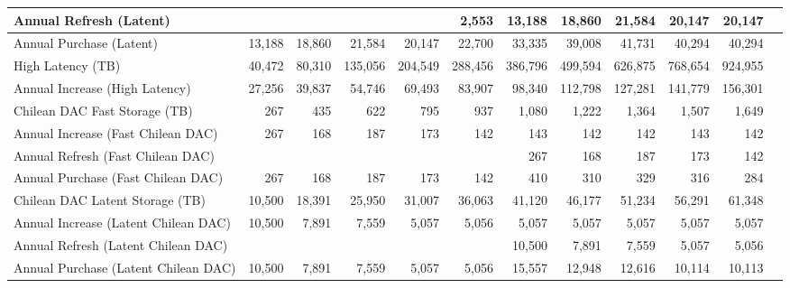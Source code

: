 \begin{longtable} { |p{}  |r  |r  |r  |r  |r  |r  |r  |r  |r  |r  |r |}
{Annual Refresh (Latent)}&{}&{}&{}&{}&{2,553}&{13,188}&{18,860}&{21,584}&{20,147}&{20,147} \\ \hline
{Annual Purchase (Latent)}&{13,188}&{18,860}&{21,584}&{20,147}&{22,700}&{33,335}&{39,008}&{41,731}&{40,294}&{40,294} \\ \hline
{High Latency (TB)}&{40,472}&{80,310}&{135,056}&{204,549}&{288,456}&{386,796}&{499,594}&{626,875}&{768,654}&{924,955} \\ \hline
{Annual Increase (High Latency)}&{27,256}&{39,837}&{54,746}&{69,493}&{83,907}&{98,340}&{112,798}&{127,281}&{141,779}&{156,301} \\ \hline
{Chilean DAC Fast Storage (TB)}&{267}&{435}&{622}&{795}&{937}&{1,080}&{1,222}&{1,364}&{1,507}&{1,649} \\ \hline
{Annual Increase (Fast Chilean DAC)}&{267}&{168}&{187}&{173}&{142}&{143}&{142}&{142}&{143}&{142} \\ \hline
{Annual Refresh (Fast Chilean DAC)}&{}&{}&{}&{}&{}&{267}&{168}&{187}&{173}&{142} \\ \hline
{Annual Purchase (Fast Chilean DAC)}&{267}&{168}&{187}&{173}&{142}&{410}&{310}&{329}&{316}&{284} \\ \hline
{Chilean DAC Latent Storage (TB)}&{10,500}&{18,391}&{25,950}&{31,007}&{36,063}&{41,120}&{46,177}&{51,234}&{56,291}&{61,348} \\ \hline
{Annual Increase (Latent Chilean DAC)}&{10,500}&{7,891}&{7,559}&{5,057}&{5,056}&{5,057}&{5,057}&{5,057}&{5,057}&{5,057} \\ \hline
{Annual Refresh (Latent Chilean DAC)}&{}&{}&{}&{}&{}&{10,500}&{7,891}&{7,559}&{5,057}&{5,056} \\ \hline
{Annual Purchase (Latent Chilean DAC)}&{10,500}&{7,891}&{7,559}&{5,057}&{5,056}&{15,557}&{12,948}&{12,616}&{10,114}&{10,113} \\ \hline
\end{longtable} \normalsize

